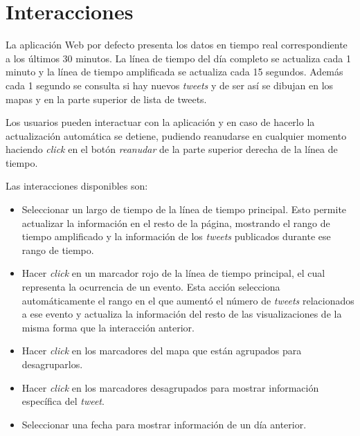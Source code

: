 \section{Interacciones}

La aplicación Web por defecto presenta los datos en tiempo real correspondiente a los últimos 30 minutos.
La línea de tiempo del día completo se actualiza cada 1 minuto y la línea de tiempo amplificada se actualiza cada 15 segundos. 
Además cada 1 segundo se consulta si hay nuevos \textit{tweets} y de ser así se dibujan en los mapas y en la parte superior de lista de tweets.  

Los usuarios pueden interactuar con la aplicación y en caso de hacerlo la actualización automática se detiene, pudiendo reanudarse en cualquier momento haciendo \textit{click} en el botón \textit{reanudar} de la parte superior derecha de la línea de tiempo. 

Las interacciones disponibles son: 

\begin{itemize}
\item Seleccionar un largo de tiempo de la línea de tiempo principal. Esto permite actualizar la información en el resto de la página, mostrando el rango de tiempo amplificado y la información de los \textit{tweets} publicados durante ese rango de tiempo. 
\item Hacer \textit{click} en un marcador rojo de la línea de tiempo principal, el cual representa la ocurrencia de un evento. Esta acción selecciona automáticamente el rango en el que aumentó el número de \textit{tweets} relacionados a ese evento y actualiza la información del resto de las visualizaciones de la misma forma que la interacción anterior. 
\item Hacer \textit{click} en los marcadores del mapa que están agrupados para desagruparlos.
\item Hacer \textit{click} en los marcadores desagrupados para mostrar información específica del \textit{tweet}.
\item Seleccionar una fecha para mostrar información de un día anterior. 
\end{itemize}




